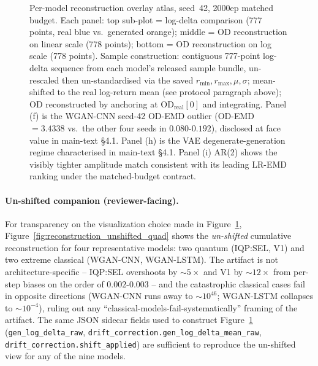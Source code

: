 \begin{figure}[!htbp]
 \caption{Per-model reconstruction overlay atlas, seed~42, 2000ep
 matched budget. Each panel: top sub-plot = log-delta comparison
 (777 points, real blue vs.\ generated orange); middle = OD
 reconstruction on linear scale (778 points); bottom = OD
 reconstruction on log scale (778 points). Sample construction:
 contiguous 777-point log-delta sequence from each model's released
 sample bundle, un-rescaled then
 un-standardised via the saved $r_{\min}, r_{\max}, \mu, \sigma$;
 mean-shifted to the real log-return mean (see protocol paragraph
 above); OD reconstructed by anchoring at $\text{OD}_{\text{real}}[0]$
 and integrating. Panel (f) is the WGAN-CNN seed-42 OD-EMD outlier
 (OD-EMD $=3.4338$ vs.\ the other four seeds in $0.080$-$0.192$),
 disclosed at face value in main-text \S 4.1. Panel (h) is the VAE
 degenerate-generation regime characterised in main-text \S 4.1.
 Panel (i) AR(2) shows the visibly tighter amplitude match
 consistent with its leading LR-EMD ranking under the matched-budget
 contract.}
 \label{fig:reconstruction_atlas}
\end{figure}

\paragraph{Un-shifted companion (reviewer-facing).}
For transparency on the visualization choice made in
Figure~\ref{fig:reconstruction_atlas}, Figure~\ref{fig:reconstruction_unshifted_quad}
shows the \emph{un-shifted} cumulative reconstruction for four
representative models: two quantum (IQP:SEL, V1) and two extreme
classical (WGAN-CNN, WGAN-LSTM). The artifact is not
architecture-specific -- IQP:SEL overshoots by ${\sim}5\times$ and
V1 by ${\sim}12\times$ from per-step biases on the order of
$0.002$-$0.003$ -- and the catastrophic classical cases fail in
opposite directions (WGAN-CNN runs away to ${\sim}10^{46}$;
WGAN-LSTM collapses to ${\sim}10^{-4}$), ruling out any
``classical-models-fail-systematically'' framing of the artifact.
The same JSON sidecar fields used to construct
Figure~\ref{fig:reconstruction_atlas} (\texttt{gen\_log\_delta\_raw},
\texttt{drift\_correction.gen\_log\_delta\_mean\_raw},
\texttt{drift\_correction.shift\_applied}) are sufficient to
reproduce the un-shifted view for any of the nine models.

